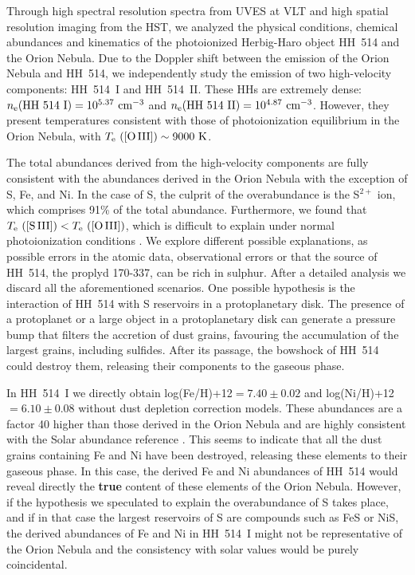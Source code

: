 \documentclass[fleqn,usenatbib]{mnras}
\begin{document}
Through high spectral resolution spectra from UVES at VLT and high spatial resolution imaging from the HST, we analyzed the physical conditions, chemical abundances and kinematics of the photoionized Herbig-Haro object HH~514 and the Orion Nebula. 
Due to the Doppler shift between the emission of the Orion Nebula and HH~514, we independently study the emission of two high-velocity components: HH~514~I and HH~514~II. These HHs are extremely dense: $n_{\rm e}(\text{HH~514~I})=10^{5.37} \text{ cm}^{-3}$ and $n_{\rm e}(\text{HH~514~II})=10^{4.87} \text{ cm}^{-3}$. However, they present temperatures consistent with those of photoionization equilibrium in the Orion Nebula, with $T_{\rm e} \text{ ([O\thinspace III])} \sim 9000\text{ K}$.

The total abundances derived from the high-velocity components are fully consistent with the abundances derived in the Orion Nebula with the exception of S, Fe, and Ni. In the case of S, the culprit of the overabundance is the S$^{2+}$ ion, which comprises 91\% of the total abundance. Furthermore, we found that $T_{\rm e} \text{ ([S\thinspace III])} < T_{\rm e} \text{ ([O\thinspace III])} $, which is difficult to explain under normal photoionization conditions \citep[][]{Binette2012}. We explore different possible explanations, as possible errors in the atomic data, observational errors or that the source of HH~514, the proplyd 170-337, can be rich in sulphur. After a detailed analysis we discard all the aforementioned scenarios. One possible hypothesis is the interaction of HH~514 with S reservoirs in a protoplanetary disk. The presence of a protoplanet or a large object in a protoplanetary disk can generate a pressure bump that filters the accretion of dust grains, favouring the accumulation of the largest grains, including sulfides. After its passage, the bowshock of HH~514 could destroy them, releasing their components to the gaseous phase.

In HH~514~I we directly obtain log(Fe/H)+12$=  7.40 \pm 0.02$ and log(Ni/H)+12$= 6.10 \pm 0.08$ without dust depletion correction models. These abundances are a factor 40 higher than those derived in the Orion Nebula and are highly consistent with the Solar abundance reference \citep[][]{lodders19}. This seems to indicate that all the dust grains containing Fe and Ni have been destroyed, releasing these elements to their gaseous phase. In this case, the derived Fe and Ni abundances of HH~514 would reveal directly the \textbf{true} content of these elements of the Orion Nebula. However, if the hypothesis we speculated to explain the overabundance of S takes place, and if in that case the largest reservoirs of S are compounds such as FeS or NiS, the derived abundances of Fe and Ni in HH~514~I might not be representative of the Orion Nebula and the consistency with solar values would be purely coincidental.
\end{document}
